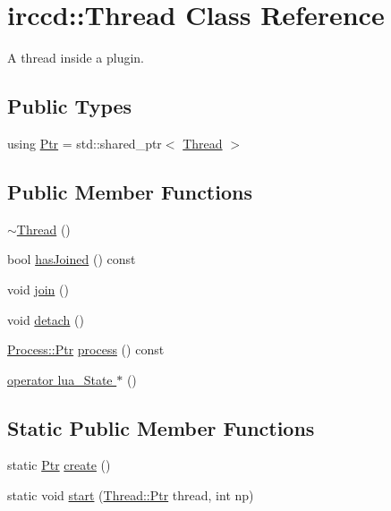 \hypertarget{a00068}{\section{irccd\-:\-:Thread Class Reference}
\label{a00068}
}


A thread inside a plugin.  


\subsection*{Public Types}
\begin{DoxyCompactItemize}
\item 
using \hyperlink{a00068_a87c135eab4b6a28732439c9131582661}{Ptr} = std\-::shared\-\_\-ptr$<$ \hyperlink{a00068}{Thread} $>$
\end{DoxyCompactItemize}
\subsection*{Public Member Functions}
\begin{DoxyCompactItemize}
\item 
\hyperlink{a00068_a23aa3ca1eee026e241cd8c3f4a5e0608}{$\sim$\-Thread} ()
\item 
bool \hyperlink{a00068_a75c97ca19dcb64ef77673f1d39132f5d}{has\-Joined} () const 
\item 
void \hyperlink{a00068_aa07d50cd26118de8bb52092c9d04e4d1}{join} ()
\item 
void \hyperlink{a00068_ac6f0c0d981232624863580e17d57e0bb}{detach} ()
\item 
\hyperlink{a00052_a9333cbafb06dbf7cd0b6ed1a8e104c5c}{Process\-::\-Ptr} \hyperlink{a00068_aa6c57498a8d65be079f2bf5df9e85034}{process} () const 
\item 
\hyperlink{a00068_a5bed0d273f37147ebc2851bd0c04e1e8}{operator lua\-\_\-\-State $\ast$} ()
\end{DoxyCompactItemize}
\subsection*{Static Public Member Functions}
\begin{DoxyCompactItemize}
\item 
static \hyperlink{a00068_a87c135eab4b6a28732439c9131582661}{Ptr} \hyperlink{a00068_afeccf95b24f4c21467dfb715a93edf3c}{create} ()
\item 
static void \hyperlink{a00068_ae9f1b8f9c39a27ed7643f4825b5d98d8}{start} (\hyperlink{a00068_a87c135eab4b6a28732439c9131582661}{Thread\-::\-Ptr} thread, int np)
\end{DoxyCompactItemize}
